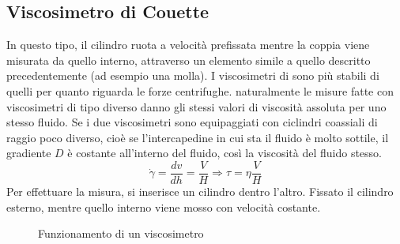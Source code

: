 \subsection{Viscosimetro di Couette}
In questo tipo, il cilindro ruota a velocità prefissata mentre la coppia viene misurata da quello interno, attraverso un elemento simile a quello descritto precedentemente (ad esempio una molla).
I viscosimetri di  sono più stabili di quelli  per quanto riguarda le forze centrifughe. naturalmente le misure fatte con viscosimetri di tipo diverso danno gli stessi valori di viscosità assoluta per uno stesso fluido.
Se i due viscosimetri sono equipaggiati con ciclindri coassiali di raggio poco diverso, cioè se l'intercapedine in cui sta il fluido è molto sottile, il gradiente $D$ è costante all'interno del fluido, così la viscosità del fluido stesso.
\begin{equation}
\dot{\gamma} = \frac{dv}{dh} = \frac{V}{H} \Rightarrow \tau = \eta \frac{V}{H}
\end{equation}
Per effettuare la misura, si inserisce un cilindro dentro l'altro. Fissato il cilindro esterno, mentre quello interno viene mosso con velocità costante.

\begin{figure}
\centering
{}\quad
{}
\caption{Funzionamento di un viscosimetro}
\label{exp:Viscosimetro}
\end{figure}

